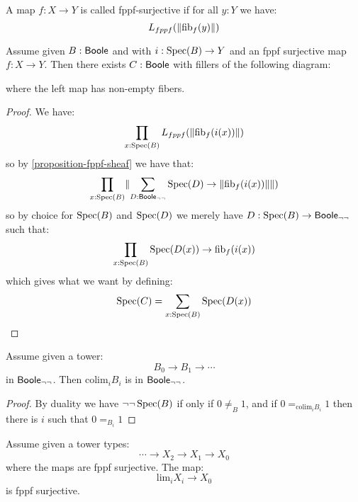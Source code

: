 \begin{definition}
A map $f:X\to Y$ is called fppf-surjective if for all $y:Y$ we have: 
\[L_{fppf}(\lVert \mathrm{fib}_f(y) \rVert)\]
\end{definition}

\begin{lemma}\label{fppf-local-choice}
Assume given $B:\mathsf{Boole}$ and with $i:\operatorname{Spec}(B)\to Y$ and an fppf surjective map $f:X\to Y$. Then there exists $C:\mathsf{Boole}$ with fillers of the following diagram:
\begin{center}
\end{center}
where the left map has non-empty fibers.
\end{lemma}

\begin{proof}
We have:
\[\prod_{x:\operatorname{Spec}(B)} L_{fppf}(\lVert \mathrm{fib}_f(i(x)) \rVert)\]
so by \cref{proposition-fppf-sheaf} we have that:
\[\prod_{x:\operatorname{Spec}(B)} \lVert \sum_{D:\mathsf{Boole}_{\neg\neg}} \operatorname{Spec}(D)\to \lVert \mathrm{fib}_f(i(x)) \rVert \rVert)\]
so by choice for $\operatorname{Spec}(B)$ and $\operatorname{Spec}(D)$ we merely have $D:\operatorname{Spec}(B)\to \mathsf{Boole}_{\neg\neg}$ such that:
\[\prod_{x:\operatorname{Spec}(B)} \operatorname{Spec}(D(x))\to \mathrm{fib}_f(i(x))\]
which gives what we want by defining:
\[\operatorname{Spec}(C) = \sum_{x:\operatorname{Spec}(B)}\operatorname{Spec}(D(x))\]
\end{proof}

\begin{lemma}\label{colimit-fppf}
Assume given a tower:
\[B_0\to B_1\to \cdots\]
in $\mathsf{Boole}_{\neg\neg}$. Then $\mathrm{colim}_i B_i$ is in $\mathsf{Boole}_{\neg\neg}$.
\end{lemma}

\begin{proof}
By duality we have $\neg\neg\operatorname{Spec}(B)$ if only if $0\not=_B1$, and if $0=_{\mathrm{colim}_iB_i}1$ then there is $i$ such that $0=_{B_i}1$
\end{proof}

\begin{lemma}\label{dependent-choice-fppf}
Assume given a tower types:
\[\cdots \to X_2\to X_1 \to X_0 \]
where the maps are fppf surjective. The map:
\[\mathrm{lim}_i X_i\to X_0\]
is fppf surjective.
\end{lemma}

